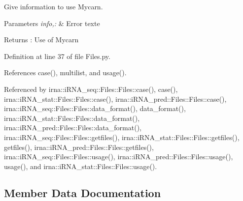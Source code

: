 \-Give information to use \-Mycarn. 


\begin{DoxyParams}{\-Parameters}
{\em info,\-:} & \-Error texte \\
\hline
\end{DoxyParams}
\begin{DoxyReturn}{\-Returns}
\-: \-Use of \-Mycarn 
\end{DoxyReturn}


\-Definition at line 37 of file \-Files.\-py.



\-References case(), multilist, and usage().



\-Referenced by irna\-::i\-R\-N\-A\-\_\-seq\-::\-Files\-::\-Files\-::case(), case(), irna\-::i\-R\-N\-A\-\_\-stat\-::\-Files\-::\-Files\-::case(), irna\-::i\-R\-N\-A\-\_\-pred\-::\-Files\-::\-Files\-::case(), irna\-::i\-R\-N\-A\-\_\-seq\-::\-Files\-::\-Files\-::data\-\_\-format(), data\-\_\-format(), irna\-::i\-R\-N\-A\-\_\-stat\-::\-Files\-::\-Files\-::data\-\_\-format(), irna\-::i\-R\-N\-A\-\_\-pred\-::\-Files\-::\-Files\-::data\-\_\-format(), irna\-::i\-R\-N\-A\-\_\-seq\-::\-Files\-::\-Files\-::getfiles(), irna\-::i\-R\-N\-A\-\_\-stat\-::\-Files\-::\-Files\-::getfiles(), getfiles(), irna\-::i\-R\-N\-A\-\_\-pred\-::\-Files\-::\-Files\-::getfiles(), irna\-::i\-R\-N\-A\-\_\-seq\-::\-Files\-::\-Files\-::usage(), irna\-::i\-R\-N\-A\-\_\-pred\-::\-Files\-::\-Files\-::usage(), usage(), and irna\-::i\-R\-N\-A\-\_\-stat\-::\-Files\-::\-Files\-::usage().



\subsection{\-Member \-Data \-Documentation}
\hypertarget{classirna_1_1David2tulip_1_1Files_1_1Files_af8e4701025ec14d10affa3ce9a714a06}{
\subsubsection[{config}]{}}
\label{classirna_1_1David2tulip_1_1Files_1_1Files_af8e4701025ec14d10affa3ce9a714a06}


